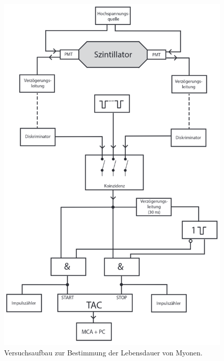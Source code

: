\begin{figure}[H]
    \centering
    \includegraphics[width = 0.6\linewidth]{bilder/AufbauV01.png}
    \caption{Versuchsaufbau zur Bestimmung der Lebensdauer von Myonen. \cite{anleitungV01}}
    \label{AufbauV01}
\end{figure}
